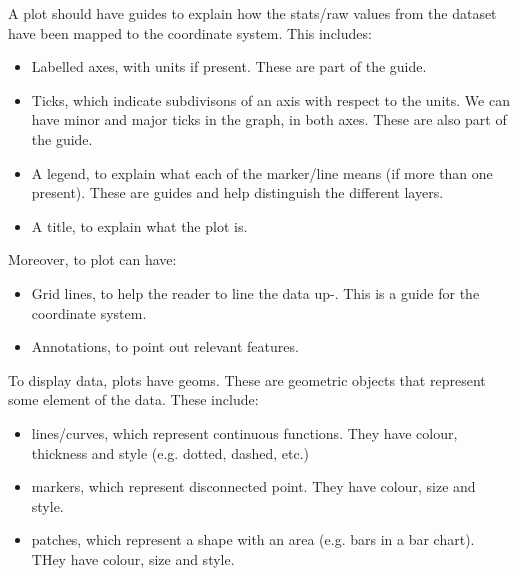 \documentclass[a4paper, openany]{memoir}
\begin{document}
A plot should have guides to explain how the stats/raw values from the dataset have been mapped to the coordinate system. This includes:
\begin{itemize}
    \item Labelled axes, with units if present. These are part of the guide.
    \item Ticks, which indicate subdivisons of an axis with respect to the units. We can have minor and major ticks in the graph, in both axes. These are also part of the guide.
    \item A legend, to explain what each of the marker/line means (if more than one present). These are guides and help distinguish the different layers.
    \item A title, to explain what the plot is.
\end{itemize}

Moreover, to plot can have:
\begin{itemize}
    \item Grid lines, to help the reader to line the data up-. This is a guide for the coordinate system.
    \item Annotations, to point out relevant features.
\end{itemize}

To display data, plots have geoms. These are geometric objects that represent some element of the data. These include:
\begin{itemize}
    \item lines/curves, which represent continuous functions. They have colour, thickness and style (e.g. dotted, dashed, etc.)
    \item markers, which represent disconnected point. They have colour, size and style.
    \item patches, which represent a shape with an area (e.g. bars in a bar chart). THey have colour, size and style.
\end{itemize}
\end{document}
